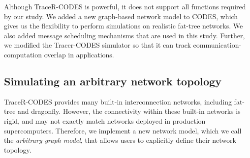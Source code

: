 Although TraceR-CODES is powerful, it does not support all functions required by
our study.
We added a new graph-based network model to CODES, which
gives us the flexibility to perform simulations on realistic fat-tree networks.
We also added message scheduling mechanisms that are used in this study.
Further, we modified the Tracer-CODES simulator so that it can track 
 communication-computation overlap in applications.


\subsection{Simulating an arbitrary network topology}

TraceR-CODES provides many built-in interconnection networks, including fat-tree
and dragonfly. However, the connectivity within these built-in networks is
rigid, and may not exactly match networks deployed in production supercomputers.
Therefore, we implement a new network model, which we call the {\em arbitrary
graph model}, that allows users to explicitly define their network topology.


